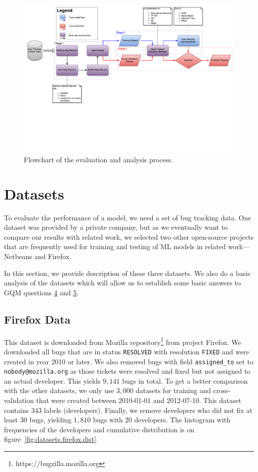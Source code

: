 \begin{figure}
    \centering
        \includegraphics[width=530px, trim=0 5cm 0 0, clip]{./images/flowchart/analysis_flowchart.pdf}
    \caption{Flowchart of the evaluation and analysis process.}
    \label{fig:model.flowchart}
\end{figure}
\clearpage

\section{Datasets}
\label{section:datasets}

To evaluate the performance of a model, we need a set of bug tracking data. One dataset was provided by a private company, but as we eventually want to compare our results with related work, we selected two other open-source projects that are frequently used for training and testing of ML models in related work---Netbeans and Firefox.

In this section, we provide description of these three datasets. We also do a basic analysis of the datasets which will allow us to establish some basic answers to GQM questions \hyperlink{question:4}{4} and \hyperlink{question:5}{5}.

\subsection{Firefox Data}

This dataset is downloaded from Mozilla repository\footnote{https://bugzilla.mozilla.org} from project Firefox. We downloaded all bugs that are in status \texttt{RESOLVED} with resolution \texttt{FIXED} and were created in year 2010 or later. We also removed bugs with field \texttt{assigned\_to} set to \texttt{nobody@mozilla.org} as those tickets were resolved and fixed but not assigned to an actual developer. This yields $9,141$ bugs in total. To get a better comparison with the other datasets, we only use $3,000$ datasets for training and cross-validation that were created between 2010-01-01 and 2012-07-10. This dataset contains $343$ labels (developers). Finally, we remove developers who did not fix at least $30$ bugs, yielding $1,810$ bugs with $20$ developers. The histogram with frequencies of the developers and cumulative distribution is on figure~\ref{fig:datasets.firefox.dist}.

